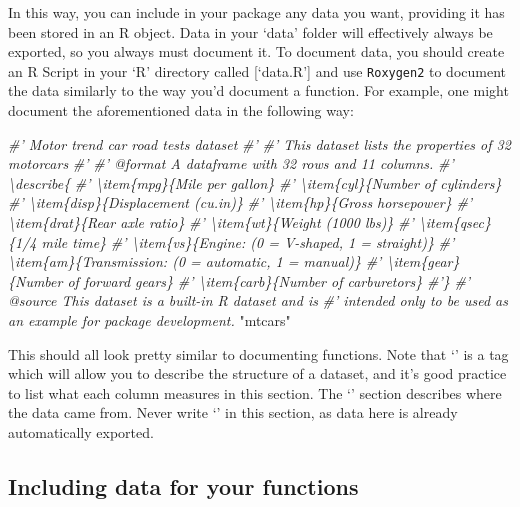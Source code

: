 \documentclass[]{book}
\newenvironment{Shaded}{\begin{snugshade}}{\end{snugshade}}
\newcommand{\StringTok}[1]{\textcolor[rgb]{0.31,0.60,0.02}{#1}}
\newcommand{\CommentTok}[1]{\textcolor[rgb]{0.56,0.35,0.01}{\textit{#1}}}
\begin{document}
In this way, you can include in your package any data you want,
providing it has been stored in an R object. Data in your `data' folder
will effectively always be exported, so you always must document it. To
document data, you should create an R Script in your `R' directory
called {[}`data.R'{]} and use \texttt{Roxygen2} to document the data
similarly to the way you'd document a function. For example, one might
document the aforementioned data in the following way:

\begin{Shaded}
\begin{Highlighting}[]
\CommentTok{#' Motor trend car road tests dataset}
\CommentTok{#'}
\CommentTok{#' This dataset lists the properties of 32 motorcars}
\CommentTok{#'}
\CommentTok{#' @format A dataframe with 32 rows and 11 columns.}
\CommentTok{#' \textbackslash{}describe\{}
\CommentTok{#'   \textbackslash{}item\{mpg\}\{Mile per gallon\}}
\CommentTok{#'   \textbackslash{}item\{cyl\}\{Number of cylinders\}}
\CommentTok{#'   \textbackslash{}item\{disp\}\{Displacement (cu.in)\}}
\CommentTok{#'   \textbackslash{}item\{hp\}\{Gross horsepower\}}
\CommentTok{#'   \textbackslash{}item\{drat\}\{Rear axle ratio\}}
\CommentTok{#'   \textbackslash{}item\{wt\}\{Weight (1000 lbs)\}}
\CommentTok{#'   \textbackslash{}item\{qsec\}\{1/4 mile time\}}
\CommentTok{#'   \textbackslash{}item\{vs\}\{Engine: (0 = V-shaped, 1 = straight)\}}
\CommentTok{#'   \textbackslash{}item\{am\}\{Transmission: (0 = automatic, 1 = manual)\}}
\CommentTok{#'   \textbackslash{}item\{gear\}\{Number of forward gears\}}
\CommentTok{#'   \textbackslash{}item\{carb\}\{Number of carburetors\}}
\CommentTok{#'\}}
\CommentTok{#' @source This dataset is a built-in R dataset and is}
\CommentTok{#' intended only to be used as an example for package development.}
\StringTok{"mtcars"}
\end{Highlighting}
\end{Shaded}

This should all look pretty similar to documenting functions. Note that
`\citet{format}' is a tag which will allow you to describe the structure
of a dataset, and it's good practice to list what each column measures
in this section. The `\citet{source}' section describes where the data
came from. Never write `\citet{export}' in this section, as data here is
already automatically exported.

\subsection{Including data for your
functions}\label{including-data-for-your-functions}
\end{document}
